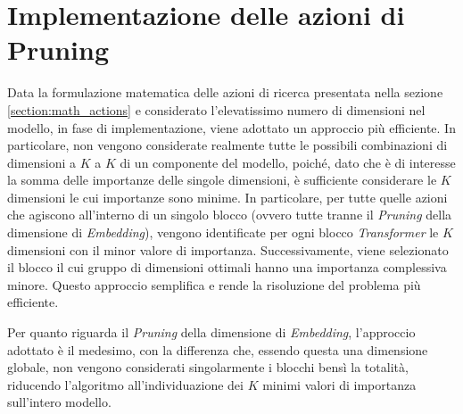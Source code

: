\section{Implementazione delle azioni di Pruning}
\label{section:action_impl}
Data la formulazione matematica delle azioni di ricerca presentata nella sezione \ref{section:math_actions} e considerato l'elevatissimo numero di dimensioni nel modello, in fase di implementazione, viene adottato un approccio più efficiente.
In particolare, non vengono considerate realmente tutte le possibili combinazioni di dimensioni a $K$ a $K$ di un componente del modello, poiché, dato che è di interesse la somma delle importanze delle singole dimensioni, è sufficiente considerare le $K$ dimensioni le cui importanze sono minime. In particolare, per tutte quelle azioni che agiscono all'interno di un singolo blocco (ovvero tutte tranne il \textit{Pruning} della dimensione di \textit{Embedding}), vengono identificate per ogni blocco \textit{Transformer} le $K$ dimensioni con il minor valore di importanza. Successivamente, viene selezionato il blocco il cui gruppo di dimensioni ottimali hanno una importanza complessiva minore. Questo approccio semplifica e rende la risoluzione del problema più efficiente. \par
Per quanto riguarda il \textit{Pruning} della dimensione di \textit{Embedding}, l'approccio adottato è il medesimo, con la differenza che, essendo questa una dimensione globale, non vengono considerati singolarmente i blocchi bensì la totalità, riducendo l'algoritmo all'individuazione dei $K$ minimi valori di importanza sull'intero modello. \par
